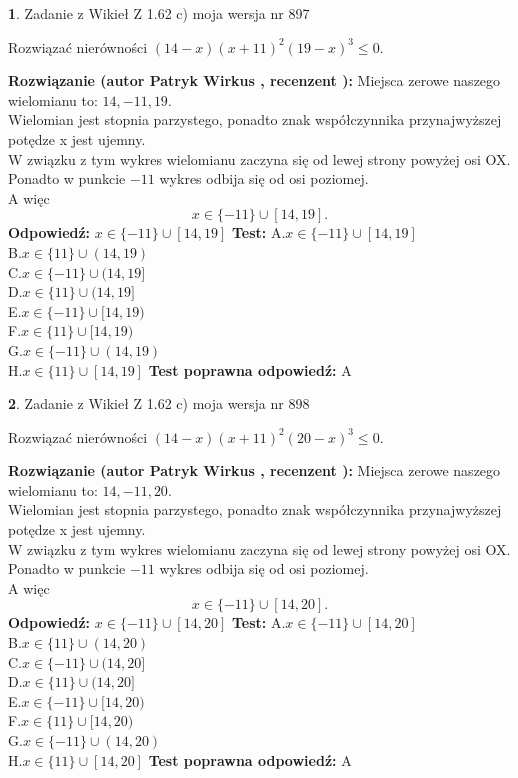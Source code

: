 \documentclass[12pt, a4paper]{article}
\theoremstyle{definition} %
\newtheorem{zad}{}
\newcommand{\zadStart}[1]{\begin{zad}#1\newline}
\newcommand{\zadStop}{\end{zad}}
\newcommand{\rozwStart}[2]{\noindent \textbf{Rozwiązanie (autor #1 , recenzent #2): }\newline}
\newcommand{\rozwStop}{\newline}
\newcommand{\odpStart}{\noindent \textbf{Odpowiedź:}\newline}
\newcommand{\odpStop}{\newline}
\newcommand{\testStart}{\noindent \textbf{Test:}\newline}
\newcommand{\testStop}{\newline}
\newcommand{\kluczStart}{\noindent \textbf{Test poprawna odpowiedź:}\newline}
\newcommand{\kluczStop}{\newline}
\begin{document}
\zadStart{Zadanie z Wikieł Z 1.62 c) moja wersja nr 897}

Rozwiązać nierówności $(14-x)(x+11)^{2}(19-x)^{3}\le0$.
\zadStop
\rozwStart{Patryk Wirkus}{}
Miejsca zerowe naszego wielomianu to: $14, -11, 19$.\\
Wielomian jest stopnia parzystego, ponadto znak współczynnika przy\linebreak najwyższej potędze x jest ujemny.\\ W związku z tym wykres wielomianu zaczyna się od lewej strony powyżej osi OX.\\
Ponadto w punkcie $-11$ wykres odbija się od osi poziomej.\\
A więc $$x \in \{-11\} \cup [14,19].$$
\rozwStop
\odpStart
$x \in \{-11\} \cup [14,19]$
\odpStop
\testStart
A.$x \in \{-11\} \cup [14,19]$\\
B.$x \in \{11\} \cup (14,19)$\\
C.$x \in \{-11\} \cup (14,19]$\\
D.$x \in \{11\} \cup (14,19]$\\
E.$x \in \{-11\} \cup [14,19)$\\
F.$x \in \{11\} \cup [14,19)$\\
G.$x \in \{-11\} \cup (14,19)$\\
H.$x \in \{11\} \cup [14,19]$
\testStop
\kluczStart
A
\kluczStop



\zadStart{Zadanie z Wikieł Z 1.62 c) moja wersja nr 898}

Rozwiązać nierówności $(14-x)(x+11)^{2}(20-x)^{3}\le0$.
\zadStop
\rozwStart{Patryk Wirkus}{}
Miejsca zerowe naszego wielomianu to: $14, -11, 20$.\\
Wielomian jest stopnia parzystego, ponadto znak współczynnika przy\linebreak najwyższej potędze x jest ujemny.\\ W związku z tym wykres wielomianu zaczyna się od lewej strony powyżej osi OX.\\
Ponadto w punkcie $-11$ wykres odbija się od osi poziomej.\\
A więc $$x \in \{-11\} \cup [14,20].$$
\rozwStop
\odpStart
$x \in \{-11\} \cup [14,20]$
\odpStop
\testStart
A.$x \in \{-11\} \cup [14,20]$\\
B.$x \in \{11\} \cup (14,20)$\\
C.$x \in \{-11\} \cup (14,20]$\\
D.$x \in \{11\} \cup (14,20]$\\
E.$x \in \{-11\} \cup [14,20)$\\
F.$x \in \{11\} \cup [14,20)$\\
G.$x \in \{-11\} \cup (14,20)$\\
H.$x \in \{11\} \cup [14,20]$
\testStop
\kluczStart
A
\kluczStop
\end{document}
